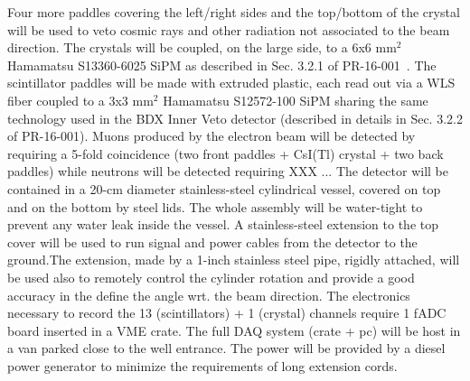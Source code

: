 Four more  paddles covering  the left/right sides and the top/bottom of the crystal will be used to veto cosmic rays and other radiation not associated to the beam direction.
The crystals will be coupled, on the large side,  to a 6x6 mm$^2$ Hamamatsu S13360-6025 SiPM as described in Sec. 3.2.1 of  PR-16-001~\cite{bdx-proposal}. The scintillator paddles will be  made with extruded plastic, each  read out via a WLS fiber coupled to a 3x3 mm$^2$ Hamamatsu S12572-100 SiPM sharing the same technology used in the BDX Inner Veto detector (described in details in Sec. 3.2.2 of  PR-16-001).
Muons produced by the electron beam will be detected by requiring a 5-fold coincidence (two front paddles + CsI(Tl) crystal + two back  paddles) while neutrons will be detected requiring XXX ...
The detector will be contained  in a 20-cm diameter stainless-steel cylindrical vessel, covered on top and on the bottom by steel lids. The whole assembly will  be water-tight to prevent any water leak inside the vessel. A stainless-steel  extension to the top cover will be used  to run signal and power cables from the detector to the ground.The extension, made by a 1-inch stainless steel pipe,  rigidly attached, will be used also  to remotely control the cylinder rotation and provide a good accuracy in the define the angle wrt. the beam direction.
The electronics necessary to record the 13 (scintillators) + 1 (crystal) channels require 1 fADC board inserted in a VME crate. The full DAQ system (crate + pc)  will be host in a van parked close to the well entrance. The power will be provided by a diesel power generator to minimize the requirements of long extension cords.
  

